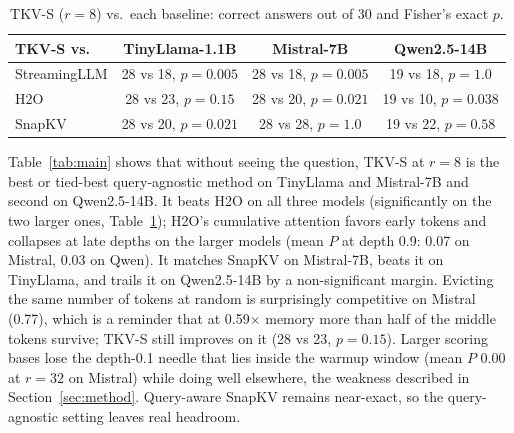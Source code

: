 \documentclass{article}
\begin{document}
\begin{table}[t]
\centering
\caption{TKV-S ($r{=}8$) vs.\ each baseline: correct answers out of 30 and
Fisher's exact $p$.}
\label{tab:sig}
\small
\begin{tabular}{lccc}
\toprule
TKV-S vs. & TinyLlama-1.1B & Mistral-7B & Qwen2.5-14B \\
\midrule
StreamingLLM & 28 vs 18, $p{=}0.005$ & 28 vs 18, $p{=}0.005$ & 19 vs 18, $p{=}1.0$ \\
H2O          & 28 vs 23, $p{=}0.15$  & 28 vs 20, $p{=}0.021$ & 19 vs 10, $p{=}0.038$ \\
SnapKV       & 28 vs 20, $p{=}0.021$ & 28 vs 28, $p{=}1.0$   & 19 vs 22, $p{=}0.58$ \\
\bottomrule
\end{tabular}
\end{table}

Table~\ref{tab:main} shows that without seeing the question, TKV-S at
$r{=}8$ is the best or tied-best query-agnostic method on
TinyLlama and Mistral-7B and second on Qwen2.5-14B. It beats H2O on all three
models (significantly on the two larger ones, Table~\ref{tab:sig}); H2O's
cumulative attention favors early tokens and collapses at late depths on the
larger models (mean $P$ at depth 0.9: 0.07 on Mistral, 0.03 on Qwen). It
matches SnapKV on Mistral-7B, beats it on TinyLlama, and trails it on
Qwen2.5-14B by a non-significant margin. Evicting the same number of tokens at
random is surprisingly competitive on Mistral (0.77), which is a reminder that
at 0.59$\times$ memory more than half of the middle tokens survive; TKV-S
still improves on it (28 vs 23, $p{=}0.15$). Larger scoring bases
lose the depth-0.1 needle that lies inside the warmup window (mean $P$ 0.00 at
$r{=}32$ on Mistral) while doing well elsewhere, the weakness described in
Section~\ref{sec:method}. Query-aware SnapKV remains near-exact, so the query-agnostic setting leaves
real headroom.
\end{document}
